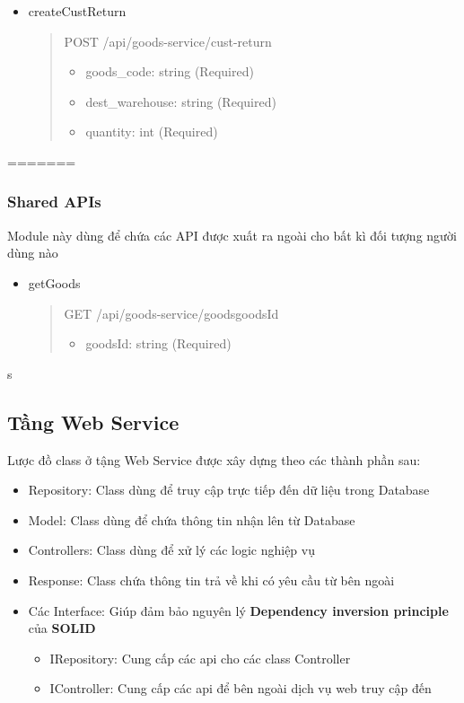 \begin{itemize}
	\item createCustReturn
	      \begin{quote}
		      POST /api/goods-service/cust-return
			  \begin{itemize}
				\item goods_code: string (Required)
				\item dest_warehouse: string (Required)
				\item quantity: int (Required)
			  \end{itemize}
	      \end{quote}
\end{itemize}

=======

\subsubsection{Shared APIs}
Module này dùng để chứa các API được xuất ra ngoài cho bất kì đối tượng người dùng nào

\begin{itemize}
	\item getGoods
	      \begin{quote}
		      GET /api/goods-service/goods{goodsId}
		      \begin{itemize}
			      \item goodsId: string (Required)
		      \end{itemize}
	      \end{quote}
\end{itemize}

s



\subsection{Tầng Web Service}

Lược đồ class ở tậng Web Service được xây dựng theo các thành phần sau:
\begin{itemize}
	\item Repository: Class dùng để truy cập trực tiếp đến dữ liệu trong Database
	\item Model: Class dùng để chứa thông tin nhận lên từ Database
	\item Controllers: Class dùng để xử lý các logic nghiệp vụ
	\item Response: Class chứa thông tin trả về khi có yêu cầu từ bên ngoài
	\item Các Interface: Giúp đảm bảo nguyên lý \textbf{Dependency inversion principle} của \textbf{SOLID}
	\begin {itemize}
		\item IRepository: Cung cấp các api cho các class Controller
		\item IController: Cung cấp các api để bên ngoài dịch vụ web truy cập đến
	\end{itemize}
\end{itemize}



